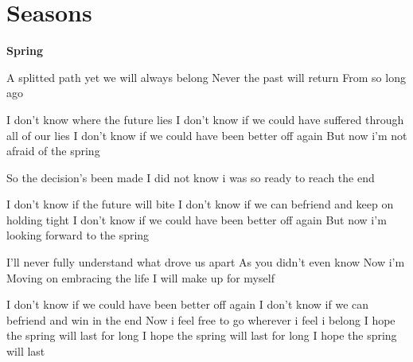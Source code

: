 \documentclass{article}
\newenvironment{album}[1]%
{%
  \section*{#1}
}%
{%
}
\newenvironment{song}[1]%
{%
  \par\vspace{\baselineskip}\noindent
  \textbf{#1}\begin{itshape}%
  \par\vspace{\baselineskip}\noindent\ignorespaces
}%
{%
  \end{itshape}\ignorespacesafterend
}
\newenvironment{couplet} %
{%
  \verbatim
}%
{% end code
  \endverbatim
}
\newenvironment{refrain} %
{%
  \verbatim
}%
{% end code
  \endverbatim
}
\begin{document}
\begin{album}{Seasons}

\begin{song}{Spring}

\begin{couplet}
A splitted path yet we will always belong
Never the past will return
From so long ago
\end{couplet}

\begin{refrain}
I don't know where the future lies
I don't know if we could have suffered through all of our lies
I don't know if we could have been better off again
But now i'm not afraid of the spring
\end{refrain}

\begin{couplet}
So the decision's been made
I did not know i was so ready to reach the end
\end{couplet}

\begin{refrain}
I don't know if the future will bite
I don't know if we can befriend and keep on holding tight
I don't know if we could have been better off again
But now i'm looking forward to the spring
\end{refrain}

\begin{couplet}
I'll never fully understand what drove us apart
As you didn't even know
Now i'm Moving on embracing the life I will make up for myself
\end{couplet}

\begin{refrain}
I don't know if we could have been better off again
I don't know if we can befriend and win in the end
Now i feel free to go wherever i feel i belong
I hope the spring will last for long
I hope the spring will last for long
I hope the spring will last
\end{refrain}

\end{song}

\end{album}
\end{document}
